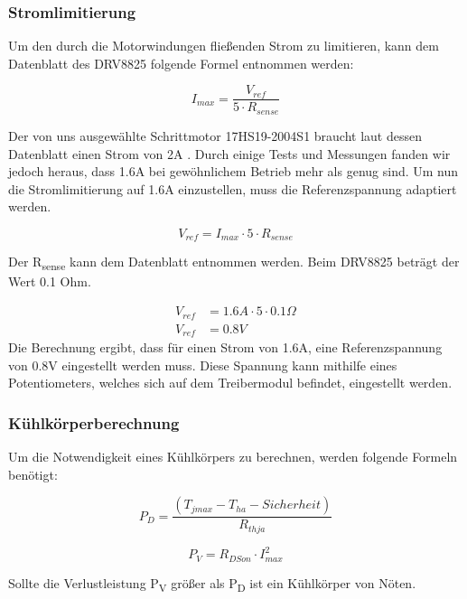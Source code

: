 \subsubsection{Stromlimitierung}
Um den durch die Motorwindungen fließenden Strom zu limitieren, kann dem Datenblatt des DRV8825 folgende Formel entnommen werden:

\begin{equation}
I_{max} = \frac{V_{ref}} {5 \cdot R_{sense}}
\end{equation}

Der von uns ausgewählte Schrittmotor 17HS19-2004S1 braucht laut dessen Datenblatt einen Strom von 2A .
Durch einige Tests und Messungen fanden wir jedoch heraus, dass 1.6A bei gewöhnlichem Betrieb mehr als genug sind.
Um nun die Stromlimitierung auf 1.6A einzustellen, muss die Referenzspannung adaptiert werden.

\begin{equation*}
V_{ref} = I_{max} \cdot 5 \cdot R_{sense}
\end{equation*}

Der R\textsubscript{sense} kann dem Datenblatt entnommen werden.
Beim DRV8825 beträgt der Wert 0.1 Ohm.

\begin{align*}
V_{ref} &= 1.6A \cdot 5 \cdot 0.1\Omega \\
V_{ref} &= 0.8V
\end{align*}
Die Berechnung ergibt, dass für einen Strom von 1.6A, eine Referenzspannung von 0.8V eingestellt werden muss.
Diese Spannung kann mithilfe eines Potentiometers, welches sich auf dem Treibermodul befindet, eingestellt werden.

\subsubsection{Kühlkörperberechnung}
Um die Notwendigkeit eines Kühlkörpers zu berechnen, werden folgende Formeln benötigt:

\begin{equation}
P_D = \frac{(T_{jmax} - T_{ha} - Sicherheit)}{R_{thja}}
\end{equation}

\begin{equation}
P_V = R_{DSon} \cdot I_{max}^2
\end{equation}

Sollte die Verlustleistung P\textsubscript{V} größer als P\textsubscript{D} ist ein Kühlkörper von Nöten. \\

